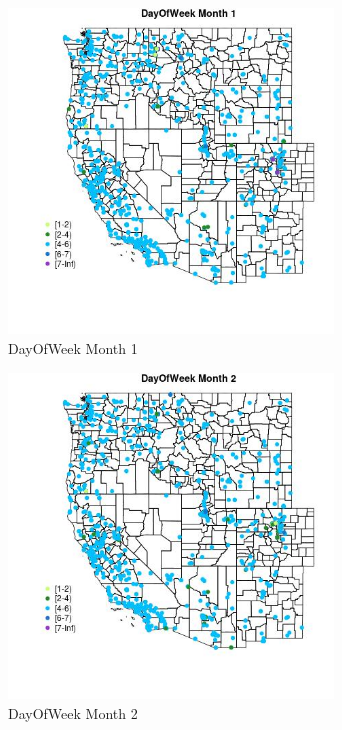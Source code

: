 \begin{figure} 
\centering  
\includegraphics[width=0.77\textwidth]{Code_Outputs/Report_ML_input_PM25_Step4_part_e_de_duplicated_aveswNAs_MapObsMo1DayOfWeek.jpg} 
\caption{\label{fig:Report_ML_input_PM25_Step4_part_e_de_duplicated_aveswNAsMapObsMo1DayOfWeek}DayOfWeek Month 1} 
\end{figure} 
 

\begin{figure} 
\centering  
\includegraphics[width=0.77\textwidth]{Code_Outputs/Report_ML_input_PM25_Step4_part_e_de_duplicated_aveswNAs_MapObsMo2DayOfWeek.jpg} 
\caption{\label{fig:Report_ML_input_PM25_Step4_part_e_de_duplicated_aveswNAsMapObsMo2DayOfWeek}DayOfWeek Month 2} 
\end{figure} 
 

